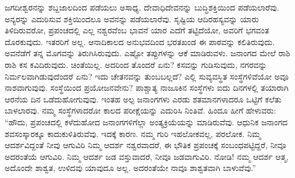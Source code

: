 ಜಗದೀಶ್ವರನನ್ನು ಶಬ್ದಜಾಲದಿಂದ ಪಡೆಯಲು ಅಸಾಧ್ಯ. ದೇವಾಧಿದೇವನನ್ನು ಬುದ್ಧಿಶಕ್ತಿಯಿಂದ ಪಡೆಯಲಾರೆವು. ಅನ್ಯರನ್ನು ಎದುರಿಸುವ ಶಕ್ತಿಯಿಂದಲೂ ಅವನನ್ನು ಪಡೆಯಲಾರೆವು. ಸೃಷ್ಟಿಯ ಆದಿರಹಸ್ಯವನ್ನು ಯಾರು ತಿಳಿದಿರುವರೋ, ಪ್ರಪಂಚದಲ್ಲಿ ಎಲ್ಲ ನಶ್ವರವೆಂಬ ಭಾವನೆ ಯಾರ ಎದೆಗೆ ತಟ್ಟಿದೆಯೋ, ಅವರಿಗೆ ಭಗವಂತ ದೊರಕುವುದು. ಇತರರಿಗೆ ಅಲ್ಲ. ಆನಾದಿಕಾಲದ ಅನುಭವದಿಂದ ಭರತಖಂಡ ಈ ಪಾಠವನ್ನು ಕಲಿತಿರುವುದು. ಅವನೆಡೆಗೆ ತನ್ನ ಮೊಗವನ್ನು ತಿರುಗಿಸಿರುವುದು. ಎಷ್ಟೋ ತಪ್ಪುಗಳನ್ನು ಆಕೆ ಮಾಡಿರುವಳು. ಜನಾಂಗದ ಮೇಲೆ ರಾಶಿ ರಾಶಿ ಕಸ ಕವಿದಿರುವುದು. ಚಿಂತೆಯಿಲ್ಲ. ಅದರಿಂದ ತೊಂದರೆ ಏನು? ಕಸವನ್ನು ಗುಡಿಸುವುದು, ನಗರವನ್ನು ನಿರ್ಮಲವಾಗಿಡುವುದೆಂದರೆ ಏನು? ಇದು ಚೇತನವನ್ನು ತುಂಬಬಲ್ಲದೆ? ಎಲ್ಲಿ ಸುವ್ಯವಸ್ಥಿತ ಸಂಸ್ಥೆಗಳಿವೆಯೋ ಅವೂ ನಾಶವಾಗುವುವು. ಸಂಸ್ಥೆಯಿಂದ ಪ್ರಯೋಜನವೇನು? ಪಾಶ್ಚಾತ್ಯ ನಾಜೂಕಿನ ಸಂಸ್ಥೆಗಳು ಐದು ದಿನಗಳಲ್ಲಿ ತಯಾರಾಗಿ ಆರನೆಯ ದಿನ ಒಡೆದುಹೋಗುವುವು. ಇಂತಹ ಅಲ್ಪ ಜನಾಂಗಗಳು ಎರಡು ಶತಮಾನಗಳಾದರೂ ಒಟ್ಟಿಗೆ ಕಲೆತು ಬಾಳಲಾರವು. ನಮ್ಮ ಸಂಸ್ಥೆಗಳಾದರೋ ಕಾಲದ ಪರೀಕ್ಷೆಯನ್ನು ಎದುರಿಸಿ ನಿಂತಿವೆ. ಹಿಂದೂ ಹೀಗೆ ಹೇಳುವರು: “ಹೌದು, ಪ್ರಪಂಚದಲ್ಲಿ ಕಳೆದುಹೋದ ಜನಾಂಗಗಳಿಗೆಲ್ಲಾ ಅಂತ್ಯಕ್ರಿಯೆಯನ್ನು ಮಾಡಿರುವೆವು. ಆಧುನಿಕ ಜನಾಂಗದ ಶವಸಂಸ್ಕಾರಕ್ಕೂ ಕಾದುಕುಳಿತಿರುವೆವು. ಇದಕ್ಕೆ ಕಾರಣ. ನಮ್ಮ ಗುರಿ ಇಹಲೋಕವಲ್ಲ, ಪರಲೋಕ. ನಿಮ್ಮ ಆದರ್ಶವಿದ್ದಂತೆ ನೀವು ಆಗುವಿರಿ ನಿಮ್ಮ ಆದರ್ಶ ನಶ್ವರವಾದರೆ, ಈ ಭೌತಿಕ ಪ್ರಪಂಚಕ್ಕೆ ಸಂಬಂಧಪಟ್ಟಿದ್ದರೆ, ನೀವೂ ಅದರಂತೆಯೆ ಆಗುವಿರಿ. ನಿಮ್ಮ ಆದರ್ಶ ಜಡ ವಸ್ತುವಾದರೆ, ನೀವೂ ಜಡವಾಗುವಿರಿ. ನೋಡಿ! ನಮ್ಮ ಆದರ್ಶ ಆತ್ಮ, ಅದೊಂದೇ ಶಾಶ್ವತ, ಉಳಿದವು ಯಾವುದೂ ಅಲ್ಲ. ಅದರಂತೆಯೇ ನಾವೂ ಶಾಶ್ವತವಾಗಿ ಬಾಳುವೆವು.”

